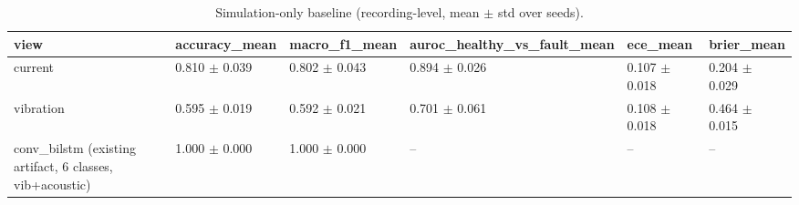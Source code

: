 \begin{table}[t]
\centering
\small
\begin{tabular}{llllll}
\toprule
view & accuracy\_mean & macro\_f1\_mean & auroc\_healthy\_vs\_fault\_mean & ece\_mean & brier\_mean \\
\midrule
current & 0.810 $\pm$ 0.039 & 0.802 $\pm$ 0.043 & 0.894 $\pm$ 0.026 & 0.107 $\pm$ 0.018 & 0.204 $\pm$ 0.029 \\
vibration & 0.595 $\pm$ 0.019 & 0.592 $\pm$ 0.021 & 0.701 $\pm$ 0.061 & 0.108 $\pm$ 0.018 & 0.464 $\pm$ 0.015 \\
conv\_bilstm (existing artifact, 6 classes, vib+acoustic) & 1.000 $\pm$ 0.000 & 1.000 $\pm$ 0.000 & -- & -- & -- \\
\bottomrule
\end{tabular}
\caption{Simulation-only baseline (recording-level, mean $\pm$ std over seeds).}
\label{tab:sim-sim_baseline}
\end{table}
